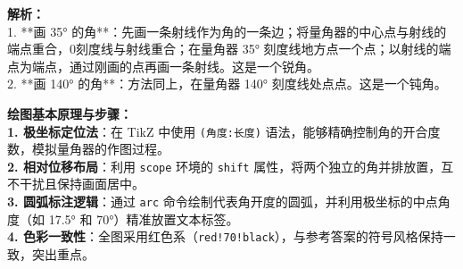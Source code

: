 \begin{center}
\end{center}

\vspace{0.8cm}

{\small\color{gray}
\textbf{解析：}\\
1. **画 35° 的角**：先画一条射线作为角的一条边；将量角器的中心点与射线的端点重合，0刻度线与射线重合；在量角器 35° 刻度线地方点一个点；以射线的端点为端点，通过刚画的点再画一条射线。这是一个锐角。\\
2. **画 140° 的角**：方法同上，在量角器 140° 刻度线处点点。这是一个钝角。
}

\vspace{0.6cm}

{\small\color{blue!70!black}
\textbf{绘图基本原理与步骤：}\\
\textbf{1. 极坐标定位法}：在 TikZ 中使用 \texttt{(角度:长度)} 语法，能够精确控制角的开合度数，模拟量角器的作图过程。\\
\textbf{2. 相对位移布局}：利用 \texttt{scope} 环境的 \texttt{shift} 属性，将两个独立的角并排放置，互不干扰且保持画面居中。\\
\textbf{3. 圆弧标注逻辑}：通过 \texttt{arc} 命令绘制代表角开度的圆弧，并利用极坐标的中点角度（如 17.5° 和 70°）精准放置文本标签。\\
\textbf{4. 色彩一致性}：全图采用红色系（\texttt{red!70!black}），与参考答案的符号风格保持一致，突出重点。
}


